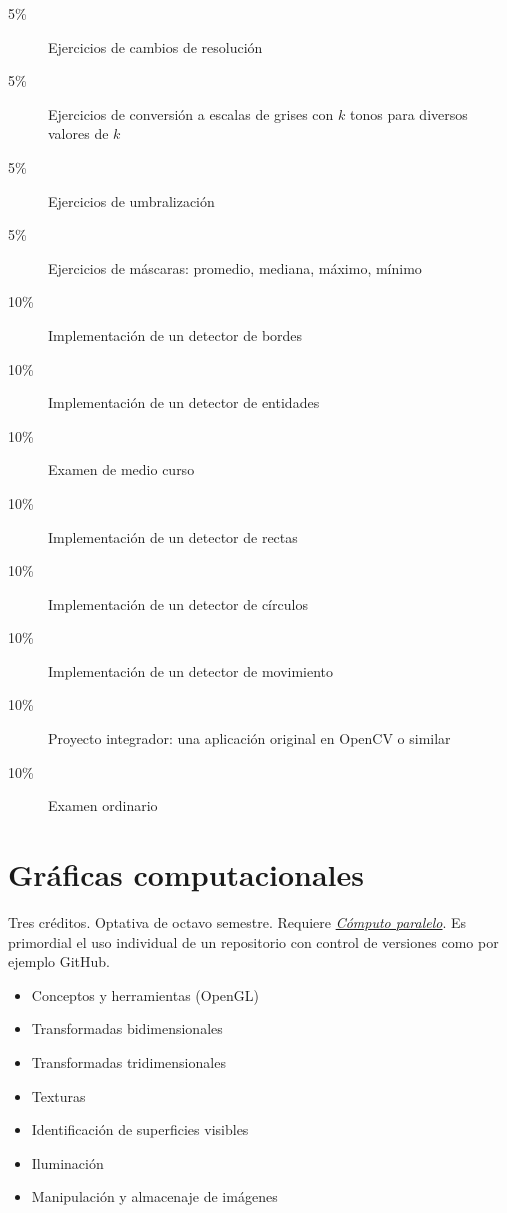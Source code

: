 \documentclass{article}
\begin{document}
\begin{multicols}{4}
\begin{description}
\item[5\%]{Ejercicios de cambios de resoluci\'{o}n}
\item[5\%]{Ejercicios de conversi\'{o}n a escalas de grises con $k$ tonos
  para diversos valores de $k$}
\item[5\%]{Ejercicios de umbralizaci\'{o}n}
\item[5\%]{Ejercicios de m\'{a}scaras: promedio, mediana, m\'{a}ximo, m\'{i}nimo}
\item[10\%]{Implementaci\'{o}n de un detector de bordes}
\item[10\%]{Implementaci\'{o}n de un detector de entidades}
\item[10\%]{Examen de medio curso}  
\item[10\%]{Implementaci\'{o}n de un detector de rectas}
\item[10\%]{Implementaci\'{o}n de un detector de c\'{i}rculos}
\item[10\%]{Implementaci\'{o}n de un detector de movimiento}  
\item[10\%]{Proyecto integrador: una aplicaci\'{o}n original en OpenCV o
  similar}
\item[10\%]{Examen ordinario}
\end{description}  

\vfill\null \columnbreak

\hypertarget{gc}{\section*{Gr\'{a}ficas computacionales}}

Tres cr\'{e}ditos. Optativa de octavo semestre.  Requiere
\hyperlink{cp}{\em C\'{o}mputo paralelo}. Es primordial el uso
individual de un repositorio con control de versiones como por ejemplo
GitHub.

\begin{itemize}
\item{Conceptos y herramientas (OpenGL)}  
\item{Transformadas bidimensionales}
\item{Transformadas tridimensionales}  
\item{Texturas}
\item{Identificaci\'{o}n de superficies visibles}  
\item{Iluminaci\'{o}n}
\item{Manipulaci\'{o}n y almacenaje de im\'{a}genes}
\end{itemize}


\end{multicols}
\end{document}
